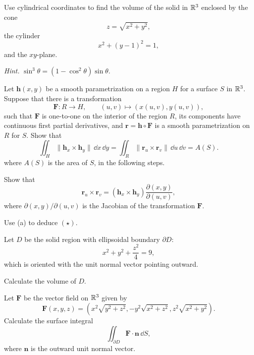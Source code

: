 \begin{problem}
Use cylindrical coordinates to find the volume of the solid in $\mathbb{R}^3$ enclosed by the cone
\[
z=\sqrt{x^2+y^2},
\]
the cylinder
\[
x^2+(y-1)^2=1,
\]
and the $xy$-plane.

\textit{Hint.} $\sin^3\theta=(1-\cos^2\theta)\sin\theta$.
\end{problem}

\begin{problem}
Let $\mathbf h(x, y)$ be a smooth parametrization on a region $H$ for a surface $S$ in $\mathbb{R}^3$. Suppose that there is a transformation
\[
\mathbf F\colon R\to H,
\qquad
(u, v)\mapsto(x(u, v), y(u, v)),
\]
such that $\mathbf F$ is one-to-one on the interior of the region $R$, its components have continuous first partial derivatives, and $\mathbf r=\mathbf h\circ\mathbf F$ is a smooth parametrization on $R$ for $S$. Show that
\[
\iint_H \|\mathbf h_x\times\mathbf h_y\|\,\dd x\,\dd y
=
\iint_R \|\mathbf r_u\times\mathbf r_v\|\,\dd u\,\dd v
=A(S).
\tag{\(\star\)}
\]
where $A(S)$ is the area of $S$, in the following steps.
\begin{problemsubparts}
\item Show that
\[
\mathbf r_u\times\mathbf r_v
=
(\mathbf h_x\times\mathbf h_y)
\frac{\partial(x, y)}{\partial(u, v)},
\]
where $\partial(x, y)/\partial(u, v)$ is the Jacobian of the transformation $\mathbf F$.
\item Use (a) to deduce $(\star)$.
\end{problemsubparts}
\end{problem}

\begin{problem}
Let $D$ be the solid region with ellipsoidal boundary $\partial D$:
\[
x^2+y^2+\frac{z^2}{4}=9,
\]
which is oriented with the unit normal vector pointing outward.
\begin{problemsubparts}
\item Calculate the volume of $D$.
\item Let $\mathbf F$ be the vector field on $\mathbb{R}^3$ given by
\[
\mathbf F(x, y, z)=
\left(
x^2\sqrt{y^2+z^2},
-y^2\sqrt{x^2+z^2},
z^2\sqrt{x^2+y^2}
\right).
\]
Calculate the surface integral
\[
\iint_{\partial D}\mathbf F\cdot\mathbf n\,\dd S,
\]
where $\mathbf n$ is the outward unit normal vector.
\end{problemsubparts}
\end{problem}

